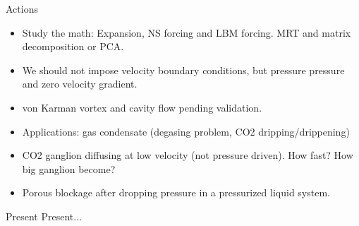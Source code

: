 \documentclass{beamer}
\begin{document}
	\begin{frame}{Actions}
		\begin{itemize}
			\item Study the math: Expansion, NS forcing and LBM forcing. MRT and matrix decomposition or PCA.
			\item We should not impose velocity boundary conditions, but pressure pressure and zero velocity gradient. 
			\item von Karman vortex and cavity flow pending validation.
			\item Applications: gas condensate (degasing problem, CO2 dripping/drippening)
			\item CO2 ganglion diffusing at low velocity (not pressure driven). How fast? How big ganglion become?
			\item Porous blockage after dropping pressure in a pressurized liquid system. 
		\end{itemize}
	\end{frame}
	
	
	

	
	
	
	\begin{frame}{Present}
		Present...
	\end{frame}
	
\end{document}
